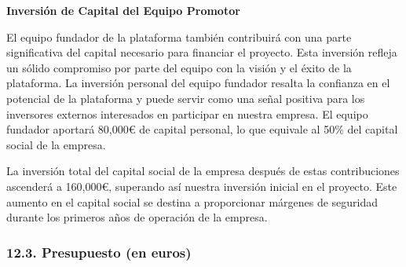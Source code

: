 \documentclass[
]{article}
\begin{document}
\textbf{Inversión de Capital del Equipo Promotor}

El equipo fundador de la plataforma también contribuirá con una parte
significativa del capital necesario para financiar el proyecto. Esta
inversión refleja un sólido compromiso por parte del equipo con la
visión y el éxito de la plataforma. La inversión personal del equipo
fundador resalta la confianza en el potencial de la plataforma y puede
servir como una señal positiva para los inversores externos interesados
en participar en nuestra empresa. El equipo fundador aportará 80,000€ de
capital personal, lo que equivale al 50\% del capital social de la
empresa.

La inversión total del capital social de la empresa después de estas
contribuciones ascenderá a 160,000€, superando así nuestra inversión
inicial en el proyecto. Este aumento en el capital social se destina a
proporcionar márgenes de seguridad durante los primeros años de
operación de la empresa.

\newpage

\subsubsection{12.3. Presupuesto (en euros)}\label{presupuesto-en-euros}
\end{document}
